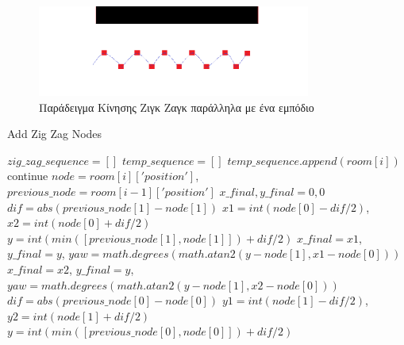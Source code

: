 \begin{figure}[!htb]
    \centering
    \includegraphics[width=0.8\textwidth]{./images/chapter5/example_zig_zag_path.png}
    \caption{Παράδειγμα Κίνησης Ζιγκ Ζαγκ παράλληλα με ένα εμπόδιο}
    \label{fig:example_zig_zag_path}
\end{figure}


\begin{algorithm}[H]
\caption{Add Zig Zag Nodes}
\label{alg:add_zig_zag_nodes}
\begin{algorithmic}[1]
        \State $zig\_zag\_sequence = []$
            \State $temp\_sequence = []$
                    \State $temp\_sequence.append(room[i])$
                    \State continue
                \EndIf
                \State $node = room[i]['position']$, $previous\_node = room[i-1]['position']$
                \State $x\_final, y\_final = 0, 0$
                    \State $dif = abs(previous\_node[1]-node[1])$
                    \State $x1 = int(node[0] - dif/2)$, $x2 = int(node[0] + dif/2)$
                    \State $y = int(min([previous\_node[1],node[1]]) + dif/2)$
                        \State $x\_final = x1$, $y\_final = y$, $yaw = math.degrees(math.atan2(y-node[1], x1-node[0]))$
                    \Else
                         \State $x\_final = x2$, $y\_final = y$, $yaw = math.degrees(math.atan2(y-node[1], x2-node[0]))$
                    \EndIf
                    \State $dif = abs(previous\_node[0]-node[0])$
                    \State $y1 = int(node[1] - dif/2)$, $y2 = int(node[1] + dif/2)$
                    \State $y = int(min([previous\_node[0],node[0]]) + dif/2)$

\end{algorithmic}
\end{algorithm}
